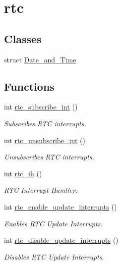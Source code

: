 \hypertarget{group__rtc}{}\section{rtc}
\label{group__rtc}
\subsection*{Classes}
\begin{DoxyCompactItemize}
\item 
struct \mbox{\hyperlink{struct_date__and___time}{Date\+\_\+and\+\_\+\+Time}}
\end{DoxyCompactItemize}
\subsection*{Functions}
\begin{DoxyCompactItemize}
\item 
int \mbox{\hyperlink{group__rtc_gabd8de825e876e8ef94c64ac616f68a11}{rtc\+\_\+subscribe\+\_\+int}} ()
\begin{DoxyCompactList}\small\item\em Subscribes R\+TC interrupts. \end{DoxyCompactList}\item 
int \mbox{\hyperlink{group__rtc_gab8f17bf5280c908c8b199a90fefcc758}{rtc\+\_\+unsubscribe\+\_\+int}} ()
\begin{DoxyCompactList}\small\item\em Unsubscribes R\+TC interrupts. \end{DoxyCompactList}\item 
int \mbox{\hyperlink{group__rtc_ga57f7116af216e3779ad9d6e98351d329}{rtc\+\_\+ih}} ()
\begin{DoxyCompactList}\small\item\em R\+TC Interrupt Handler. \end{DoxyCompactList}\item 
int \mbox{\hyperlink{group__rtc_ga1d3c9242fe8175549f6b898cf55582fd}{rtc\+\_\+enable\+\_\+update\+\_\+interrupts}} ()
\begin{DoxyCompactList}\small\item\em Enables R\+TC Update Interrupts. \end{DoxyCompactList}\item 
int \mbox{\hyperlink{group__rtc_ga71a212cd88a2e2b09096d345a86c1eb8}{rtc\+\_\+disable\+\_\+update\+\_\+interrupts}} ()
\begin{DoxyCompactList}\small\item\em Disables R\+TC Update Interrupts. \end{DoxyCompactList}\item 

\end{DoxyCompactItemize}
